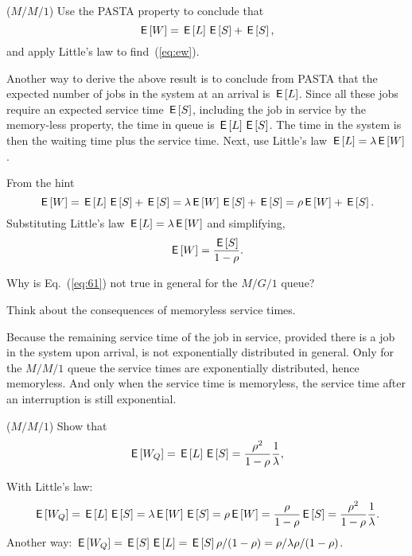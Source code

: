 \begin{exercise}($M/M/1$) Use the PASTA property to conclude that
\begin{equation}\label{eq:61}
  \,\mathsf{E}\left[W\right] = \,\mathsf{E}\left[L\right]  \,\mathsf{E}\left[S\right] + \,\mathsf{E}\left[S\right],
\end{equation}
and apply Little's law to find~(\ref{eq:ew}). 
\begin{hint}
Another way to derive the above result is to conclude from PASTA that
the expected number of jobs in the system at an arrival is $\,\mathsf{E}\left[L\right]$.
Since all these jobs require an expected service time $\,\mathsf{E}\left[S\right]$,
including the job in service by the memory-less property, the time in
queue is $\,\mathsf{E}\left[L\right] \,\mathsf{E}\left[S\right]$. The time in the system is then the waiting time
plus the service time. Next, use Little's law $\,\mathsf{E}\left[L\right] = \lambda \,\mathsf{E}\left[W\right]$.
\end{hint}
\begin{solution}
From the hint
\begin{equation}
  \,\mathsf{E}\left[W\right] = \,\mathsf{E}\left[L\right]  \,\mathsf{E}\left[S\right] + \,\mathsf{E}\left[S\right] = \lambda \,\mathsf{E}\left[W\right] \,\mathsf{E}\left[S\right] + \,\mathsf{E}\left[S\right] = \rho \,\mathsf{E}\left[W\right]  + \,\mathsf{E}\left[S\right].
\end{equation}
Substituting Little's law $\,\mathsf{E}\left[L\right] = \lambda \,\mathsf{E}\left[W\right]$ and simplifying,
\begin{equation*}
\,\mathsf{E}\left[W\right] = \frac{\,\mathsf{E}\left[S\right]}{1-\rho}.
\end{equation*}
\end{solution}
\end{exercise}


\begin{exercise}
  Why is Eq.~(\ref{eq:61}) not true in general for the $M/G/1$ queue?
  \begin{hint}
Think about the consequences of memoryless service times.
  \end{hint}
  \begin{solution}
    Because the remaining service time of the job in service, provided
    there is a job in the system upon arrival, is not exponentially
    distributed in general. Only for the $M/M/1$ queue the service
    times are exponentially distributed, hence memoryless. And only
    when the service time is memoryless, the service time after an
    interruption is still exponential.
  \end{solution}
\end{exercise}

\begin{exercise}($M/M/1$)
Show that 
\begin{equation}\label{eq:wqes}
  \,\mathsf{E}\left[W_Q\right] = \,\mathsf{E}\left[L\right] \,\mathsf{E}\left[S\right] = \frac{\rho^2}{1-\rho} \frac 1 \lambda,
\end{equation}
  \begin{solution}
With Little's law:
\begin{equation}
  \,\mathsf{E}\left[W_Q\right] = \,\mathsf{E}\left[L\right] \,\mathsf{E}\left[S\right] = \lambda \,\mathsf{E}\left[W\right] \,\mathsf{E}\left[S\right]= \rho \,\mathsf{E}\left[W\right] = \frac{\rho}{1-\rho} \,\mathsf{E}\left[S\right] = \frac{\rho^2}{1-\rho} \frac 1 \lambda.
\end{equation}
Another way: $\,\mathsf{E}\left[W_Q\right] = \,\mathsf{E}\left[S\right] \,\mathsf{E}\left[L\right] = \,\mathsf{E}\left[S\right] \rho/(1-\rho) = \rho/\lambda \rho/(1-\rho)$.
  \end{solution}
\end{exercise}

